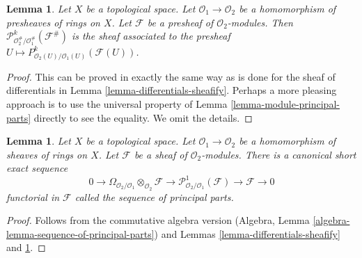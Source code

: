 \documentclass{stacks-project}
\theoremstyle{plain}
\newtheorem{lemma}[subsection]{Lemma}
\theoremstyle{definition}
\theoremstyle{remark}
\numberwithin{equation}{subsection}
\begin{document}
\begin{lemma}
\label{lemma-differential-operators-sheafify}
Let $X$ be a topological space. Let $\mathcal{O}_1 \to \mathcal{O}_2$
be a homomorphism of presheaves of rings on $X$. Let $\mathcal{F}$ be a
presheaf of $\mathcal{O}_2$-modules. Then
$\mathcal{P}^k_{\mathcal{O}_2^\#/\mathcal{O}_1^\#}(\mathcal{F}^\#)$
is the sheaf associated to the presheaf
$U \mapsto P^k_{\mathcal{O}_2(U)/\mathcal{O}_1(U)}(\mathcal{F}(U))$.
\end{lemma}

\begin{proof}
This can be proved in exactly the same way as is done for the sheaf
of differentials in Lemma \ref{lemma-differentials-sheafify}.
Perhaps a more pleasing approach is to use the universal property
of Lemma \ref{lemma-module-principal-parts} directly to see the equality.
We omit the details.
\end{proof}

\begin{lemma}
\label{lemma-sequence-of-principal-parts}
Let $X$ be a topological space. Let $\mathcal{O}_1 \to \mathcal{O}_2$
be a homomorphism of sheaves of rings on $X$. Let $\mathcal{F}$ be a
sheaf of $\mathcal{O}_2$-modules. There is a
canonical short exact sequence
$$
0 \to
\Omega_{\mathcal{O}_2/\mathcal{O}_1} \otimes_{\mathcal{O}_2} \mathcal{F} \to
\mathcal{P}^1_{\mathcal{O}_2/\mathcal{O}_1}(\mathcal{F}) \to
\mathcal{F} \to 0
$$
functorial in $\mathcal{F}$ called the {\it sequence of principal parts}.
\end{lemma}

\begin{proof}
Follows from the commutative algebra version
(Algebra, Lemma \ref{algebra-lemma-sequence-of-principal-parts})
and Lemmas \ref{lemma-differentials-sheafify} and
\ref{lemma-differential-operators-sheafify}.
\end{proof}
\end{document}
